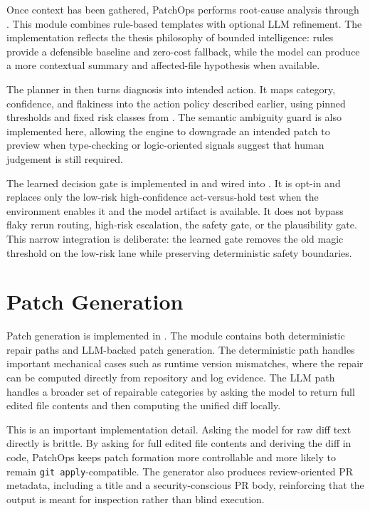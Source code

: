 Once context has been gathered, PatchOps performs root-cause analysis through . This
module combines rule-based templates with optional LLM refinement. The implementation reflects the thesis
philosophy of bounded intelligence: rules provide a defensible baseline and zero-cost fallback, while the model
can produce a more contextual summary and affected-file hypothesis when available.

The planner in  then turns diagnosis into intended action. It maps category,
confidence, and flakiness into the action policy described earlier, using pinned thresholds and fixed risk
classes from . The semantic ambiguity guard is also implemented here, allowing the engine to
downgrade an intended patch to preview when type-checking or logic-oriented signals suggest that human judgement
is still required.

The learned decision gate is implemented in  and wired into
. It is opt-in and replaces only the low-risk high-confidence act-versus-hold test when the
environment enables it and the model artifact is available. It does not bypass flaky rerun routing, high-risk
escalation, the safety gate, or the plausibility gate. This narrow integration is deliberate: the learned gate
removes the old magic threshold on the low-risk lane while preserving deterministic safety boundaries.

\section{Patch Generation}

Patch generation is implemented in . The module contains both deterministic repair
paths and LLM-backed patch generation. The deterministic path handles important mechanical cases such as runtime
version mismatches, where the repair can be computed directly from repository and log evidence. The LLM path
handles a broader set of repairable categories by asking the model to return full edited file contents and then
computing the unified diff locally.

This is an important implementation detail. Asking the model for raw diff text directly is brittle. By asking
for full edited file contents and deriving the diff in code, PatchOps keeps patch formation more controllable
and more likely to remain \texttt{git apply}-compatible. The generator also produces review-oriented PR
metadata, including a title and a security-conscious PR body, reinforcing that the output is meant for
inspection rather than blind execution.

